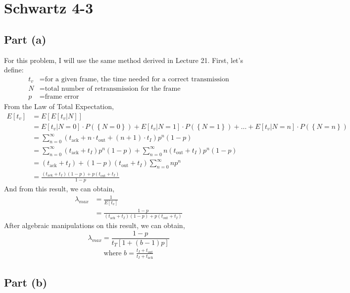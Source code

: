 \documentclass{article}
\begin{document}
\section*{Schwartz 4-3}
	\subsection*{Part (a)}
		For this problem, I will use the same method derived in Lecture 21.
		First, let's define:
		\begin{align*}
			t_v &= \text{for a given frame, the time needed for a correct transmission} \\
			N &= \text{total number of retransmission for the frame} \\
			p &= \text{frame error}
		\end{align*}
		From the Law of Total Expectation,
		\begin{align*}
			E[t_v] &= E[E[t_v | N]] \\
			&= E[t_v | N = 0] \cdot P(\left\{ N = 0\right\}) + E[t_v | N = 1] \cdot P(\left\{ N = 1\right\}) + \ldots + E[t_v | N = n] \cdot P(\left\{ N = n\right\}) \\
			&= \sum_{n=0}^{\infty} (t_{\text{ack}} + n \cdot t_{\text{out}} + (n+1) \cdot t_I) p^{n}(1-p) \\
			&= \sum_{n=0}^{\infty} (t_{\text{ack}} + t_I) p^{n}(1-p) + \sum_{n=0}^{\infty} n(t_{\text{out}} + t_I) p^{n}(1-p) \\
			&= (t_{\text{ack}} + t_I) + (1-p)(t_{\text{out}} + t_I)\sum_{n=0}^{\infty} np^{n} \\
			&= \frac{(t_{\text{ack}} + t_I)(1-p) + p(t_{\text{out}} + t_I)}{1-p}
		\end{align*}
		And from this result, we can obtain,
		\begin{align*}
			\lambda_{max} &= \frac{1}{E[t_v]} \\
			&= \frac{1-p}{(t_{\text{ack}} + t_I)(1-p) + p(t_{\text{out}} + t_I)}
		\end{align*}
		After algebraic manipulations on this result, we can obtain,
		\begin{equation}
			\lambda_{max} = \frac{1-p}{t_{T}[1 + (b-1)p]}
		\end{equation}
		\begin{align*}
			\text{where } b = \frac{t_I + t_{\text{out}}}{t_I + t_{\text{ack}}}
		\end{align*}
	\subsection*{Part (b)}
\end{document}
